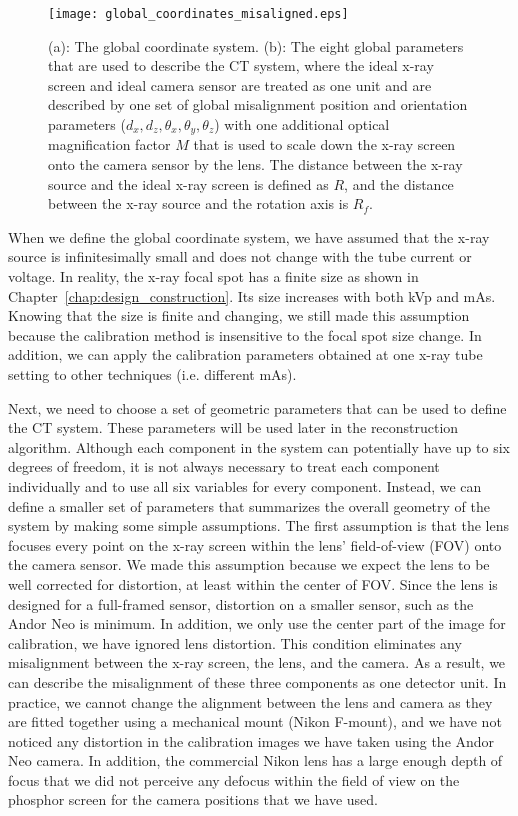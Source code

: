 \begin{figure}[ht]
\centering
\texttt{[image: global\_coordinates\_misaligned.eps]}
\caption{ (a): The global coordinate system.  (b): The eight global parameters that are used to describe the CT system, where the ideal x-ray screen and ideal camera sensor are treated as one unit and are described by one set of global misalignment position and orientation parameters ($d_x, d_z, \theta_x, \theta_y, \theta_z$) with one additional optical magnification factor $M$ that is used to scale down the x-ray screen onto the camera sensor by the lens.  The distance between the x-ray source and the ideal x-ray screen is defined as $R$, and the distance between the x-ray source and the rotation axis is $R_f$.}
\label{fig:global_coord_misaligned}
\end{figure}

When we define the global coordinate system, we have assumed that the x-ray source is infinitesimally small and does not change with the tube current or voltage.  In reality, the x-ray focal spot has a finite size as shown in Chapter~\ref{chap:design_construction}.  Its size increases with both kVp and mAs.  Knowing that the size is finite and changing, we still made this assumption because the calibration method is insensitive to the focal spot size change.  In addition, we can apply the calibration parameters obtained at one x-ray tube setting to other techniques (i.e. different mAs). 

Next, we need to choose a set of geometric parameters that can be used to define the CT system.  These parameters will be used later in the reconstruction algorithm.  Although each component in the system can potentially have up to six degrees of freedom, it is not always necessary to treat each component individually and to use all six variables for every component.  Instead, we can define a smaller set of parameters that summarizes the overall geometry of the system by making some simple assumptions.  The first assumption is that the lens focuses every point on the x-ray screen within the lens' field-of-view (FOV) onto the camera sensor.  We made this assumption because we expect the lens to be well corrected for distortion, at least within the center of FOV.  Since the lens is designed for a full-framed sensor, distortion on a smaller sensor, such as the Andor Neo is minimum.  In addition, we only use the center part of the image for calibration, we have ignored lens distortion.  This condition eliminates any misalignment between the x-ray screen, the lens, and the camera.  As a result, we can describe the misalignment of these three components as one detector unit.  In practice, we cannot change the alignment between the lens and camera as they are fitted together using a mechanical mount (Nikon F-mount), and we have not noticed any distortion in the calibration images we have taken using the Andor Neo camera.  In addition, the commercial Nikon lens has a large enough depth of focus that we did not perceive any defocus within the field of view on the phosphor screen for the camera positions that we have used.


